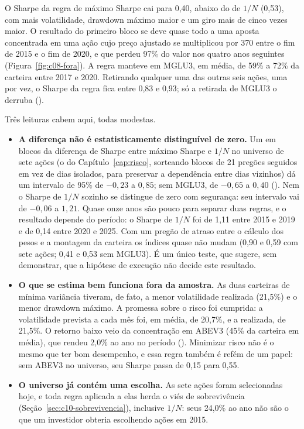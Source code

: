 O Sharpe da regra de máximo Sharpe cai para 0,40, abaixo do de $1/N$ (0,53), com mais volatilidade, drawdown máximo maior e um giro mais de cinco vezes maior. O resultado do primeiro bloco se deve quase todo a uma aposta concentrada em uma ação cujo preço ajustado se multiplicou por 370 entre o fim de 2015 e o fim de 2020, e que perdeu 97\% do valor nos quatro anos seguintes (Figura~\ref{fig:c08-fora}). A regra manteve em MGLU3, em média, de 59\% a 72\% da carteira entre 2017 e 2020. Retirando qualquer uma das outras seis ações, uma por vez, o Sharpe da regra fica entre 0,83 e 0,93; só a retirada de MGLU3 o derruba ().


Três leituras cabem aqui, todas modestas.

\begin{itemize}
  \item \textbf{A diferença não é estatisticamente distinguível de zero.} Um  em blocos da diferença de Sharpe entre máximo Sharpe e $1/N$ no universo de sete ações (o  do Capítulo~\ref{cap:risco}, sorteando blocos de 21 pregões seguidos em vez de dias isolados, para preservar a dependência entre dias vizinhos) dá um intervalo de 95\% de $-0,23$ a $0,85$; sem MGLU3, de $-0,65$ a $0,40$ (). Nem o Sharpe de $1/N$ sozinho se distingue de zero com segurança: seu intervalo vai de $-0,06$ a $1,21$. Quase onze anos são pouco para separar duas regras, e o resultado depende do período: o Sharpe de $1/N$ foi de 1,11 entre 2015 e 2019 e de 0,14 entre 2020 e 2025. Com um pregão de atraso entre o cálculo dos pesos e a montagem da carteira os índices quase não mudam (0,90 e 0,59 com sete ações; 0,41 e 0,53 sem MGLU3). É um único teste, que sugere, sem demonstrar, que a hipótese de execução não decide este resultado.
  \item \textbf{O que se estima bem funciona fora da amostra.} As duas carteiras de mínima variância tiveram, de fato, a menor volatilidade realizada (21,5\%) e o menor drawdown máximo. A promessa sobre o risco foi cumprida: a volatilidade prevista a cada mês foi, em média, de 20,7\%, e a realizada, de 21,5\%. O retorno baixo veio da concentração em ABEV3 (45\% da carteira em média), que rendeu 2,0\% ao ano no período (). Minimizar risco não é o mesmo que ter bom desempenho, e essa regra também é refém de um papel: sem ABEV3 no universo, seu Sharpe passa de 0,15 para 0,55.
  \item \textbf{O universo já contém uma escolha.} As sete ações foram selecionadas hoje, e toda regra aplicada a elas herda o viés de sobrevivência (Seção~\ref{sec:c10-sobrevivencia}), inclusive $1/N$: seus 24,0\% ao ano não são o que um investidor obteria escolhendo ações em 2015.
\end{itemize}

